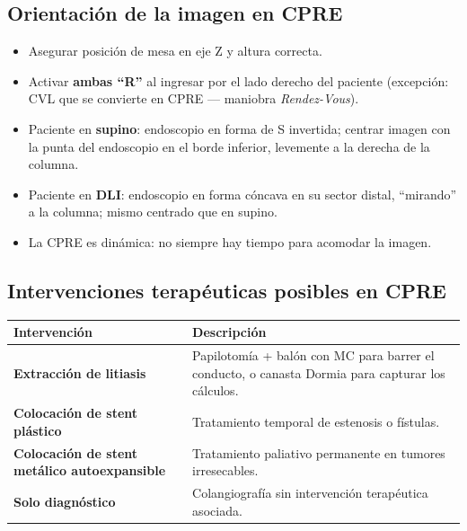 \subsection*{Orientación de la imagen en CPRE}

\begin{itemize}[noitemsep]
	\item Asegurar posición de mesa en eje Z y altura correcta.
	\item Activar \textbf{ambas ``R''} al ingresar por el lado derecho del paciente (excepción: CVL que se convierte en CPRE --- maniobra \textit{Rendez-Vous}).
	\item Paciente en \textbf{supino}: endoscopio en forma de S invertida; centrar imagen con la punta del endoscopio en el borde inferior, levemente a la derecha de la columna.
	\item Paciente en \textbf{DLI}: endoscopio en forma cóncava en su sector distal, ``mirando'' a la columna; mismo centrado que en supino.
	\item La CPRE es dinámica: no siempre hay tiempo para acomodar la imagen.
\end{itemize}

\subsection*{Intervenciones terapéuticas posibles en CPRE}

{\renewcommand{\arraystretch}{1.3}
	\begin{center}
		\begin{tabular}{>{\bfseries}p{3.5cm} p{10cm}}
			\hline
			Intervención & Descripción \\
			\hline
			Extracción de litiasis & Papilotomía + balón con MC para barrer el conducto, o canasta Dormia para capturar los cálculos. \\[0.5em]
			\hline
			Colocación de stent plástico & Tratamiento temporal de estenosis o fístulas. \\[0.5em]
			\hline
			Colocación de stent metálico autoexpansible & Tratamiento paliativo permanente en tumores irresecables. \\[0.5em]
			\hline
			Solo diagnóstico & Colangiografía sin intervención terapéutica asociada. \\
			\hline
		\end{tabular}
	\end{center}
}
